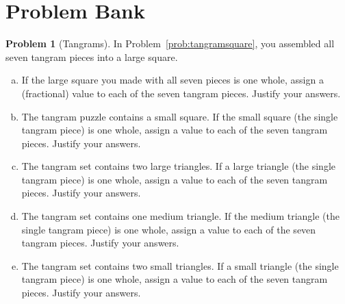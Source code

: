 \documentclass[12pt, reqno]{amsart}
\theoremstyle{remark}
\theoremstyle{definition}
\newtheorem{problem}{Problem}
\numberwithin{equation}{section}  %
\begin{document}
\newpage







\newpage

\section{Problem Bank}

\begin{problem}[Tangrams]
In Problem~\ref{prob:tangramsquare}, you assembled all seven tangram pieces into a large square.

\begin{enumerate} [(a)]
 \item
If the large square you made with all seven pieces is one whole, assign a (fractional) value to each of the seven tangram pieces.  Justify your answers. \\

 
\item
The tangram puzzle contains a small square.  If the small square (the single tangram piece)  is one whole, assign a  value to each of the seven tangram pieces.  Justify your answers. \\


 \item
The tangram set contains two large triangles.  If a large triangle (the single tangram piece)  is one whole, assign a  value to each of the seven tangram pieces.  Justify your answers. \\



 \item
The tangram set contains one medium triangle.  If the medium triangle (the single tangram piece)  is one whole, assign a  value to each of the seven tangram pieces.  Justify your answers. \\
 


 \item
The tangram set contains two small triangles.  If a small triangle (the single tangram piece)  is one whole, assign a  value to each of the seven tangram pieces.  Justify your answers. \\
 



 \end{enumerate}
 \end{problem}



\bigskip
\end{document}
